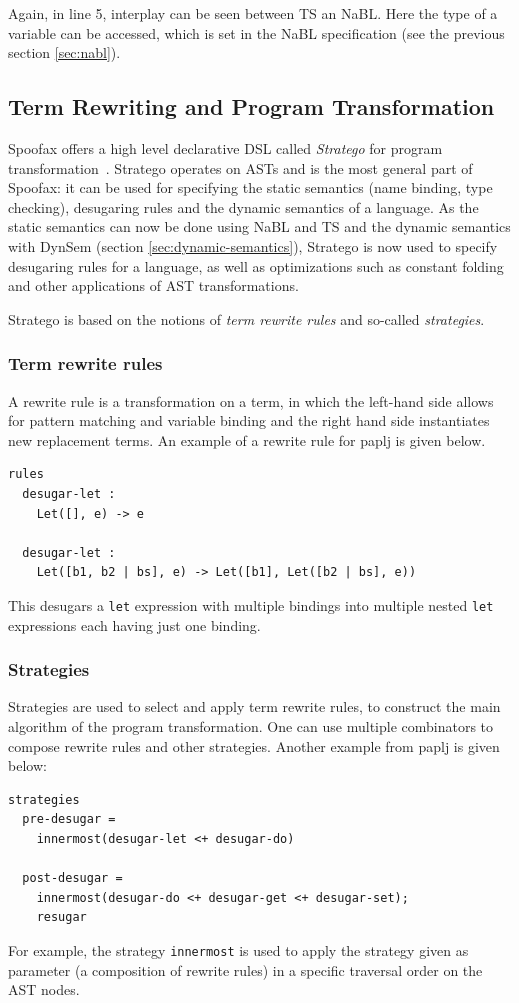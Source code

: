 Again, in line 5, interplay can be seen between TS an NaBL. Here the
type of a variable can be accessed, which is set in the NaBL
specification (see the previous section \ref{sec:nabl}).
\subsection{Term Rewriting and Program Transformation}
\label{sec:term-rewrite}
Spoofax offers a high level declarative DSL called \emph{Stratego} for
program transformation~\cite{Visser01}. Stratego operates on ASTs
and is the most general part of Spoofax: it can be used for specifying
the static semantics (name binding, type checking), desugaring rules
and the dynamic semantics of a language. As the static semantics can
now be done using NaBL and TS and the dynamic semantics with DynSem
(section \ref{sec:dynamic-semantics}), Stratego is now used to specify
desugaring rules for a language, as well as optimizations such as
constant folding and other applications of AST transformations.

Stratego is based on the notions of \emph{term rewrite rules} and so-called
\emph{strategies}.
\subsubsection{Term rewrite rules}
\label{sec:orgheadline4}
A rewrite rule is a transformation on a term, in which the left-hand
side allows for pattern matching and variable binding and the right
hand side instantiates new replacement terms. An example of a rewrite
rule for paplj is given below.
\lstset{language=stratego,numbers=left}
\begin{lstlisting}
rules
  desugar-let :
  	Let([], e) -> e

  desugar-let :
  	Let([b1, b2 | bs], e) -> Let([b1], Let([b2 | bs], e))
\end{lstlisting}
This desugars a \texttt{let} expression with multiple bindings into multiple
nested \texttt{let} expressions each having just one binding.
\subsubsection{Strategies}
\label{sec:orgheadline5}
Strategies are used to select and apply term rewrite rules, to
construct the main algorithm of the program transformation. One can
use multiple combinators to compose rewrite rules and other
strategies. Another example from paplj is given below:
\lstset{language=stratego,numbers=left}
\begin{lstlisting}
strategies
  pre-desugar =
    innermost(desugar-let <+ desugar-do)

  post-desugar =
    innermost(desugar-do <+ desugar-get <+ desugar-set);
    resugar
\end{lstlisting}
For example, the strategy \texttt{innermost} is used to apply the strategy
given as parameter (a composition of rewrite rules) in a specific
traversal order on the AST nodes.
